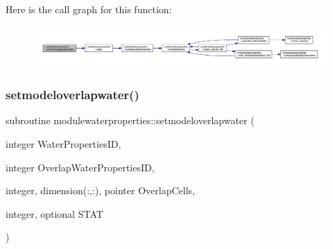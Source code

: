 Here is the call graph for this function\+:\nopagebreak
\begin{figure}[H]
\begin{center}
\leavevmode
\includegraphics[width=350pt]{namespacemodulewaterproperties_a04f02aae382274eb3a7fb04e8be06e48_cgraph}
\end{center}
\end{figure}
\mbox{\label{namespacemodulewaterproperties_a485e6f75e05fccffb1b2eba1fc8c0226}} 
\subsubsection{\texorpdfstring{setmodeloverlapwater()}{setmodeloverlapwater()}}
{\footnotesize\ttfamily subroutine modulewaterproperties\+::setmodeloverlapwater (\begin{DoxyParamCaption}\item[{integer}]{Water\+Properties\+ID,  }\item[{integer}]{Overlap\+Water\+Properties\+ID,  }\item[{integer, dimension(\+:,\+:), pointer}]{Overlap\+Cells,  }\item[{integer, optional}]{S\+T\+AT }\end{DoxyParamCaption})\hspace{0.3cm}{\ttfamily [private]}}

